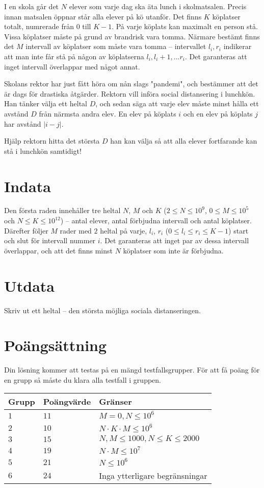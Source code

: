 
I en skola går det $N$ elever som varje dag ska äta lunch i skolmatsalen.
Precis innan matsalen öppnar står alla elever på kö utanför.
Det finns $K$ köplatser totalt, numrerade från $0$ till $K-1$.
På varje köplats kan maximalt en person stå.
Vissa köplatser måste på grund av brandrisk vara tomma.
Närmare bestämt finns det $M$ intervall av köplatser som måste vara tomma --
intervallet $l_i,r_i$ indikerar att man inte får stå på någon av köplatserna $l_i,l_i+1,...r_i$.
Det garanteras att inget intervall överlappar med något annat.

Skolans rektor har just fått höra om nån slags "pandemi", och bestämmer att det är dags för drastiska åtgärder.
Rektorn vill införa social distansering i lunchkön.
Han tänker välja ett heltal $D$, och sedan säga att varje elev måste minst hålla ett avstånd $D$ från närmsta andra elev.
En elev på köplats $i$ och en elev på köplats $j$ har avstånd $|i-j|$.

Hjälp rektorn hitta det största $D$ han kan välja så att alla elever fortfarande kan stå i lunchkön samtidigt!


\section*{Indata}
Den första raden innehåller tre heltal $N$, $M$ och $K$ ($2 \leq N \leq 10^9$, $0 \leq M \leq 10^5$ och $N \leq K \leq 10^{12}$) --
antal elever, antal förbjudna intervall och antal köplatser.
Därefter följer $M$ rader med $2$ heltal på varje, $l_i$, $r_i$  ($0 \le l_i \le r_i \le K-1$) start och slut för intervall nummer $i$.
Det garanteras att inget par av dessa intervall överlappar, och att det finns minst $N$ köplatser som inte är förbjudna.

\section*{Utdata}
Skriv ut ett heltal -- den största möjliga sociala distanseringen. 
\section*{Poängsättning}
Din lösning kommer att testas på en mängd testfallsgrupper.
För att få poäng för en grupp så måste du klara alla testfall i gruppen.

\noindent
\begin{tabular}{| l | l | l |}
  \hline
  Grupp & Poängvärde & Gränser \\ \hline
  $1$    & $11$      &  $M = 0, N \leq 10^6$ \\ \hline
  $2$    & $10$      &  $N \cdot K \cdot M \leq 10^6$ \\ \hline
  $3$    & $15$      &  $N, M \leq 1000, N \leq K \leq 2000$ \\ \hline
  $4$    & $19$      &  $N \cdot M \leq 10^7$ \\ \hline
  $5$    & $21$      &  $N \leq 10^6 $ \\ \hline
  $6$    & $24$      &  Inga ytterligare begränsningar \\ \hline
\end{tabular}
